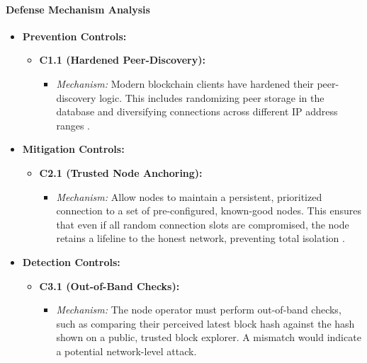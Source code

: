 \paragraph{Defense Mechanism Analysis}

\begin{itemize}
    \item \textbf{Prevention Controls:}
    \begin{itemize}
        \item \textbf{C1.1 (Hardened Peer-Discovery):}
            \begin{itemize}
                \item \textit{Mechanism:} Modern blockchain clients have hardened their peer-discovery logic. This includes randomizing peer storage in the database and diversifying connections across different IP address ranges \cite{wang2019}.
            \end{itemize}
    \end{itemize}
    \item \textbf{Mitigation Controls:}
    \begin{itemize}
        \item \textbf{C2.1 (Trusted Node Anchoring):}
            \begin{itemize}
                \item \textit{Mechanism:} Allow nodes to maintain a persistent, prioritized connection to a set of pre-configured, known-good nodes. This ensures that even if all random connection slots are compromised, the node retains a lifeline to the honest network, preventing total isolation \cite{wang2019}.
            \end{itemize}
    \end{itemize}
    \item \textbf{Detection Controls:}
    \begin{itemize}
        \item \textbf{C3.1 (Out-of-Band Checks):}
            \begin{itemize}
                \item \textit{Mechanism:} The node operator must perform out-of-band checks, such as comparing their perceived latest block hash against the hash shown on a public, trusted block explorer. A mismatch would indicate a potential network-level attack.
            \end{itemize}
    \end{itemize}
\end{itemize}

